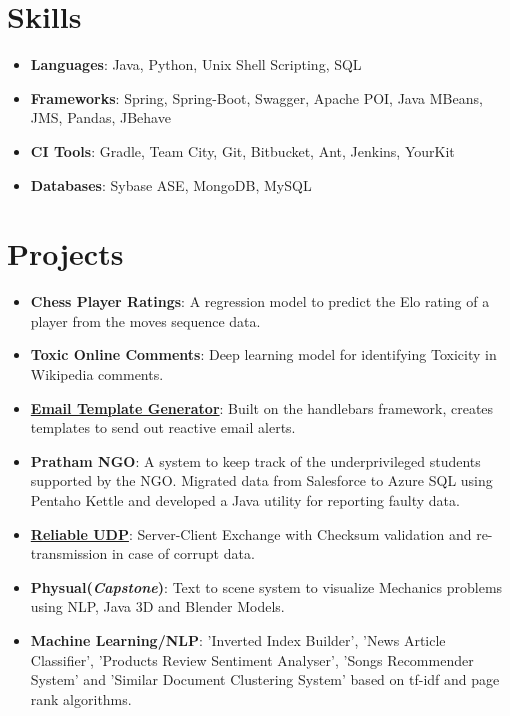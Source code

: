 \documentclass[letterpaper,11pt]{article}
\newcommand{\resumeItem}[2]{
  \item\small{
    \textbf{#1}{: #2 \vspace{-2pt}}
  }
}
\newcommand{\resumeSubItem}[2]{\resumeItem{#1}{#2}\vspace{-4pt}}
\newcommand{\resumeSubHeadingListStart}{\begin{itemize}[leftmargin=*]}
\newcommand{\resumeSubHeadingListEnd}{\end{itemize}}
\begin{document}
\section{{\faGears} Skills}
 \resumeSubHeadingListStart
 \resumeSubItem{Languages}{Java, Python, Unix Shell Scripting, SQL}
 \resumeSubItem{Frameworks}{Spring, Spring-Boot, Swagger, Apache POI, Java MBeans, JMS, Pandas, JBehave}
 \resumeSubItem{CI Tools}{Gradle, Team City, Git, Bitbucket, Ant, Jenkins, YourKit}
 \resumeSubItem{Databases}{Sybase ASE, MongoDB, MySQL}
 \resumeSubHeadingListEnd

\section{{\faFlask} Projects}
  \resumeSubHeadingListStart
  \resumeSubItem{Chess Player Ratings} {A regression model to predict the Elo rating of a player from the moves sequence data.
  }\resumeSubItem{Toxic Online Comments} {
  Deep learning model for identifying Toxicity in Wikipedia comments.
  }
  \resumeSubItem{\href{https://github.com/amanpreet692/HandleBarsEmailTemplate}
    {Email Template Generator}}
    {Built on the handlebars framework, creates templates to send out reactive email alerts.}
    \resumeSubItem{Pratham NGO}
      {A system to keep track of the  underprivileged students supported by the NGO. Migrated data from Salesforce to Azure SQL using Pentaho Kettle and developed a Java utility for reporting faulty data.}
    \resumeSubItem{\href{https://bitbucket.org/APS692/udp-with-error-detection} {Reliable UDP}}
      {Server-Client Exchange with Checksum validation and re-transmission in case of corrupt data.}
  \resumeSubItem{Physual(\textit{Capstone})}
      {Text to scene system to visualize Mechanics problems using NLP, Java 3D and Blender Models.}
\resumeSubItem{Machine Learning/NLP}
    {'Inverted Index Builder', 'News Article Classifier', 'Products Review Sentiment Analyser', 'Songs Recommender System' and 'Similar Document Clustering System' based on tf-idf and page rank algorithms.
    }      
  \resumeSubHeadingListEnd
\end{document}
